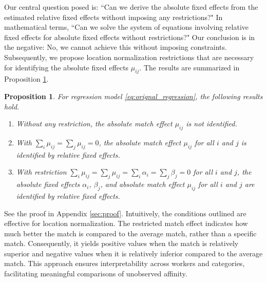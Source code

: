 \documentclass[12pt]{article}
\newtheorem{proposition}{Proposition}
\begin{document}
Our central question posed is: ``Can we derive the absolute fixed effects from the estimated relative fixed effects without imposing any restrictions?" In mathematical terms, ``Can we solve the system of equations involving relative fixed effects for absolute fixed effects without restrictions?"
Our conclusion is in the negative: No, we cannot achieve this without imposing constraints.
Subsequently, we propose location normalization restrictions that are necessary for identifying the absolute fixed effects \( \mu_{ij} \). 
The results are summarized in Proposition \ref{prop:main_results}.
\begin{proposition}\label{prop:main_results}
For regression model \eqref{eq:orignal_regression}, the following results hold.
\begin{enumerate}
    \item Without any restriction, the absolute match effect $\mu_{ij}$ is not identified. 
    \item With $\sum_i \mu_{i j}=\sum_j \mu_{i j}=0$, the absolute match effect $\mu_{ij}$ for all $i$ and $j$ is identified by relative fixed effects. 
    \item With restriction $\sum_i \mu_{i j}=\sum_j \mu_{i j}=\sum_i \alpha_i=\sum_j \beta_j=0$ for all $i$ and $j$, the absolute fixed effects $\alpha_i$, $\beta_j$, and absolute match effect $\mu_{ij}$ for all $i$ and $j$ are identified by relative fixed effects.
\end{enumerate}

\end{proposition}
See the proof in Appendix \ref{sec:proof}.
Intuitively, the conditions outlined are effective for location normalization. The restricted match effect indicates how much better the match is compared to the average match, rather than a specific match. Consequently, it yields positive values when the match is relatively superior and negative values when it is relatively inferior compared to the average match. This approach ensures interpretability across workers and categories, facilitating meaningful comparisons of unobserved affinity.
\end{document}

